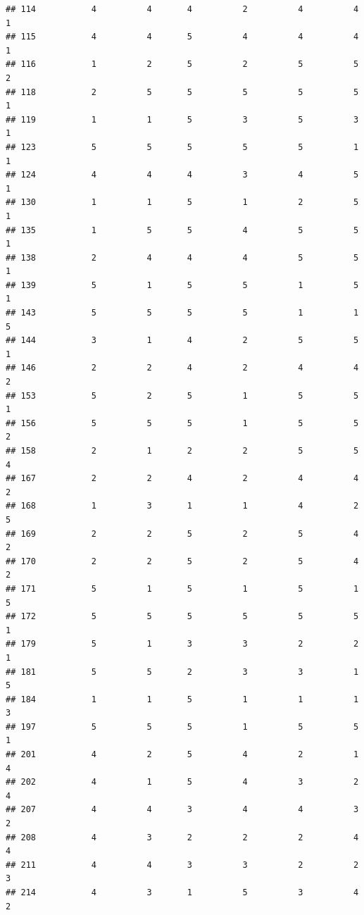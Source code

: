 \documentclass[
]{article}
\begin{document}
\begin{verbatim}
## 114           4          4       4          2          4          4        1
## 115           4          4       5          4          4          4        1
## 116           1          2       5          2          5          5        2
## 118           2          5       5          5          5          5        1
## 119           1          1       5          3          5          3        1
## 123           5          5       5          5          5          1        1
## 124           4          4       4          3          4          5        1
## 130           1          1       5          1          2          5        1
## 135           1          5       5          4          5          5        1
## 138           2          4       4          4          5          5        1
## 139           5          1       5          5          1          5        1
## 143           5          5       5          5          1          1        5
## 144           3          1       4          2          5          5        1
## 146           2          2       4          2          4          4        2
## 153           5          2       5          1          5          5        1
## 156           5          5       5          1          5          5        2
## 158           2          1       2          2          5          5        4
## 167           2          2       4          2          4          4        2
## 168           1          3       1          1          4          2        5
## 169           2          2       5          2          5          4        2
## 170           2          2       5          2          5          4        2
## 171           5          1       5          1          5          1        5
## 172           5          5       5          5          5          5        1
## 179           5          1       3          3          2          2        1
## 181           5          5       2          3          3          1        5
## 184           1          1       5          1          1          1        3
## 197           5          5       5          1          5          5        1
## 201           4          2       5          4          2          1        4
## 202           4          1       5          4          3          2        4
## 207           4          4       3          4          4          3        2
## 208           4          3       2          2          2          4        4
## 211           4          4       3          3          2          2        3
## 214           4          3       1          5          3          4        2

\end{verbatim}
\end{document}
